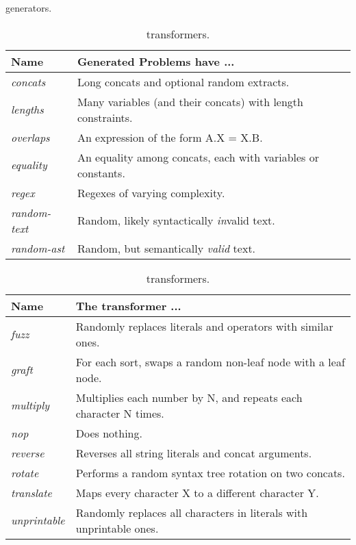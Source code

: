 \begin{table}[H]
    \caption{\generator{} generators.}
    \label{tbl:generators}
    \begin{tabular}{|l|l|}
        \hline
        \textbf{Name}        & \textbf{Generated Problems have ...} \\ \hline
        \textit{concats}     & Long concats and optional random extracts. \\ \hline
        \textit{lengths}     & Many variables (and their concats) with length constraints. \\ \hline
        \textit{overlaps}    & An expression of the form A.X = X.B. \\ \hline
        \textit{equality}    & An equality among concats, each with variables or constants. \\ \hline
        \textit{regex}       & Regexes of varying complexity. \\ \hline
        \textit{random-text} & Random, likely syntactically \textit{in}valid text. \\ \hline
        \textit{random-ast}  & Random, but semantically \textit{valid} text. \\ \hline
    \end{tabular}
    \caption{\transformer{} transformers.}
    \label{tbl:transformers}
    \begin{tabular}{|l|l|}
        \hline
        \textbf{Name}        & \textbf{The transformer ...} \\ \hline
        \textit{fuzz}        & Randomly replaces literals and operators with similar ones. \\ \hline
        \textit{graft}       & For each sort, swaps a random non-leaf node with a leaf node. \\ \hline
        \textit{multiply}    & Multiplies each number by N, and repeats each character N times. \\ \hline
        \textit{nop}         & Does nothing. \\ \hline
        \textit{reverse}     & Reverses all string literals and concat arguments. \\ \hline
        \textit{rotate}      & Performs a random syntax tree rotation on two concats. \\ \hline
        \textit{translate}   & Maps every character X to a different character Y. \\ \hline
        \textit{unprintable} & Randomly replaces all characters in literals with unprintable ones. \\ \hline
    \end{tabular}
\end{table}

